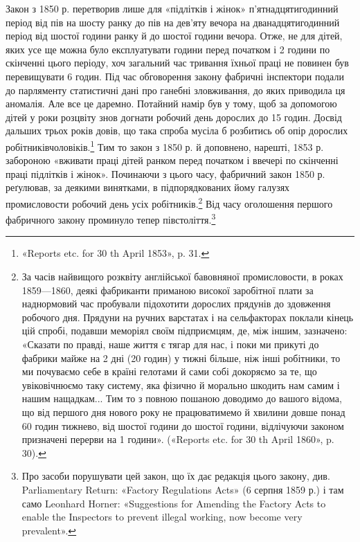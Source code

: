 Закон з 1850 р. перетворив лише для «підлітків і жінок»
п’ятнадцятигодинний період від пів на шосту ранку до пів на
дев’яту вечора на дванадцятигодинний період від шостої години
ранку й до шостої години вечора. Отже, не для дітей, яких усе
ще можна було експлуатувати  години перед початком і 2
години по скінченні цього періоду, хоч загальний час тривання
їхньої праці не повинен був перевищувати 6 годин. Під час обговорення
закону фабричні інспектори подали до парляменту статистичні
дані про ганебні зловживання, до яких приводила ця
аномалія. Але все це даремно. Потайний намір був у тому, щоб
за допомогою дітей у роки розцвіту знов догнати робочий день
дорослих до 15 годин. Досвід дальших трьох років довів, що
така спроба мусіла б розбитись об опір дорослих робітниківчоловіків.\footnote{
«Reports etc. for 30 th April 1853», p. 31.
}
Тим то закон з 1850 р. й доповнено, нарешті, 1853 р.
забороною «вживати праці дітей ранком перед початком і ввечері
по скінченні праці підлітків і жінок». Починаючи з цього часу,
фабричний закон 1850 р. реґулював, за деякими винятками, в
підпорядкованих йому галузях промисловости робочий день усіх
робітників.\footnote{
За часів найвищого розквіту англійської бавовняної промисловости,
в роках 1859—1860, деякі фабриканти приманою високої заробітної
плати за наднормовий час пробували підохотити дорослих прядунів до
здовження робочого дня. Прядуни на ручних варстатах і на сельфакторах
поклали кінець цій спробі, подавши меморіял своїм підприємцям, де, між
іншим, зазначено: «Сказати по правді, наше життя є тягар для нас, і
поки ми прикуті до фабрики майже на 2 дні (20 годин) у тижні
більше, ніж інші робітники, то ми почуваємо себе в країні гелотами й
сами собі докоряємо за те, що увіковічнюємо таку систему, яка фізично
й морально шкодить нам самим і нашим нащадкам... Тим то з повною
пошаною доводимо до вашого відома, що від першого дня нового року
не працюватимемо й хвилини довше понад 60 годин тижнево, від шостої
години до шостої години, відлічуючи законом призначені перерви на
1 години». («Reports etc. for 30 th April 1860», p. 30).
} Від часу оголошення першого фабричного закону
проминуло тепер півстоліття.\footnote{
Про засоби порушувати цей закон, що їх дає редакція цього закону,
див. Parliamentary Return: «Factory Regulations Acts» (6 серпня 1859 р.) і
там само Leonhard Horner: «Suggestions for Amending the Factory Acts to
enable the Inspectors to prevent illegal working, now become very prevalent».
}

